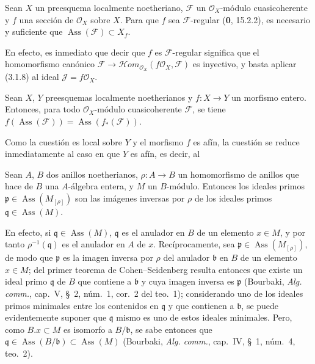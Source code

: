 \begin{corollary}[3.1.9]
\label{IV.2.3.1.9-fr}
Sean $X$ un preesquema localmente noetheriano, $\mathcal F$ un
$\mathcal O_X$-módulo cuasicoherente y $f$ una sección de $\mathcal O_X$
sobre $X$. Para que $f$ sea $\mathcal F$-regular \textup{(\textbf{0}, 15.2.2)}, es necesario y
suficiente que $\operatorname{Ass}(\mathcal F)\subset X_f$.
\end{corollary}

En efecto, es inmediato que decir que $f$ es $\mathcal F$-regular significa
que el homomorfismo canónico
$\mathcal F\to\mathcal Hom_{\mathcal O_X}(f\mathcal O_X,\mathcal F)$ es
inyectivo, y basta aplicar (3.1.8) al ideal $\mathcal J=f\mathcal O_X$.

\begin{proposition}[3.1.10]
\label{IV.2.3.1.10-fr}
Sean $X$, $Y$ preesquemas localmente noetherianos y $f:X\to Y$ un morfismo
entero. Entonces, para todo $\mathcal O_X$-módulo cuasicoherente $\mathcal F$,
se tiene
$f(\operatorname{Ass}(\mathcal F))=\operatorname{Ass}(f_*(\mathcal F))$.
\end{proposition}

Como la cuestión es local sobre $Y$ y el morfismo $f$ es afín, la cuestión se reduce
inmediatamente al caso en que $Y$ es afín, es decir, al

\begin{lemma}[3.1.10.1]
\label{IV.2.3.1.10.1-fr}
Sean $A$, $B$ dos anillos noetherianos, $\rho:A\to B$ un homomorfismo de
anillos que hace de $B$ una $A$-álgebra entera, y $M$ un $B$-módulo. Entonces
los ideales primos $\mathfrak p\in\operatorname{Ass}(M_{[\rho]})$ son las
imágenes inversas por $\rho$ de los ideales primos
$\mathfrak q\in\operatorname{Ass}(M)$.
\end{lemma}

En efecto, si $\mathfrak q\in\operatorname{Ass}(M)$, $\mathfrak q$ es el
anulador en $B$ de un elemento $x\in M$, y por tanto
$\rho^{-1}(\mathfrak q)$ es el anulador en $A$ de $x$. Recíprocamente, sea
$\mathfrak p\in\operatorname{Ass}(M_{[\rho]})$, de modo que $\mathfrak p$ es
la imagen inversa por $\rho$ del anulador $\mathfrak b$ en $B$ de un elemento
$x\in M$; del primer teorema de Cohen--Seidenberg resulta entonces que existe
un ideal primo $\mathfrak q$ de $B$ que contiene a $\mathfrak b$ y cuya imagen
inversa es $\mathfrak p$ (Bourbaki, \emph{Alg. comm.}, cap.~V, \S~2, núm.~1,
cor.~2 del teo.~1); considerando uno de los ideales primos minimales entre los
contenidos en $\mathfrak q$ y que contienen a $\mathfrak b$, se puede
evidentemente suponer que $\mathfrak q$ mismo es uno de estos ideales
minimales. Pero, como $B.x\subset M$ es isomorfo a
$B/\mathfrak b$, se sabe entonces que
$\mathfrak q\in\operatorname{Ass}(B/\mathfrak b)\subset\operatorname{Ass}(M)$
(Bourbaki, \emph{Alg. comm.}, cap.~IV, \S~1, núm.~4, teo.~2).


